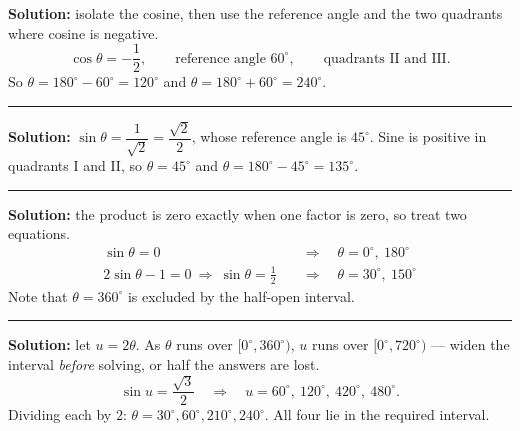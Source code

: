 \documentclass[12pt]{article}
\begin{document}



\textbf{Solution:} isolate the cosine, then use the reference angle and the two quadrants where cosine is negative.
\[ \cos\theta = -\frac{1}{2}, \qquad \text{reference angle } 60^\circ, \qquad \text{quadrants II and III}. \]
So $\theta = 180^\circ - 60^\circ = 120^\circ$ and $\theta = 180^\circ + 60^\circ = 240^\circ$. 

\vspace{0.15cm}\noindent\rule{\linewidth}{0.2pt}\vspace{0.15cm}


\textbf{Solution:} $\sin\theta = \dfrac{1}{\sqrt{2}} = \dfrac{\sqrt{2}}{2}$, whose reference angle is $45^\circ$. Sine is positive in quadrants I and II, so
$\theta = 45^\circ$ and $\theta = 180^\circ - 45^\circ = 135^\circ$. 

\vspace{0.15cm}\noindent\rule{\linewidth}{0.2pt}\vspace{0.15cm}


\textbf{Solution:} the product is zero exactly when one factor is zero, so treat two equations.
\begin{align*}
  \sin\theta = 0 \quad&\Longrightarrow\quad \theta = 0^\circ,\ 180^\circ \\
  2\sin\theta - 1 = 0 \ \Longrightarrow\ \sin\theta = \tfrac{1}{2} \quad&\Longrightarrow\quad \theta = 30^\circ,\ 150^\circ
\end{align*}
Note that $\theta = 360^\circ$ is excluded by the half-open interval. 

\vspace{0.15cm}\noindent\rule{\linewidth}{0.2pt}\vspace{0.15cm}


\textbf{Solution:} let $u = 2\theta$. As $\theta$ runs over $[0^\circ, 360^\circ)$, $u$ runs over $[0^\circ, 720^\circ)$ --- widen the interval \emph{before} solving, or half the answers are lost.
\[ \sin u = \frac{\sqrt{3}}{2} \quad\Longrightarrow\quad u = 60^\circ,\ 120^\circ,\ 420^\circ,\ 480^\circ. \]
Dividing each by $2$: $\theta = 30^\circ, 60^\circ, 210^\circ, 240^\circ$. All four lie in the required interval. 
\end{document}
